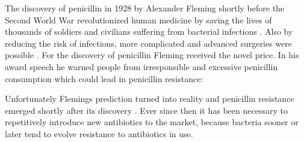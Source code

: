 The discovery of penicillin in 1928 by Alexander Fleming shortly before the Second World War revolutionized human medicine by saving the lives of thousands of soldiers and civilians suffering from bacterial infections \cite{cdc_biggest_2019}. Also by reducing the risk of infections, more complicated and advanced surgeries were possible \cite{worldwar_resistance}. 
For the discovery of penicillin Fleming received the novel price. In his award speech he warned people from irresponsible and excessive penicillin consumption which could lead in penicillin resistance:

 
 
Unfortunately Flemings prediction turned into reality and penicillin resistance emerged shortly after its discovery \cite{lobanovska_penicillins_2017}. Ever since then it has been necessary to repetitively introduce new antibiotics to the market, because bacteria sooner or later tend to evolve resistance to antibiotics in use. 

